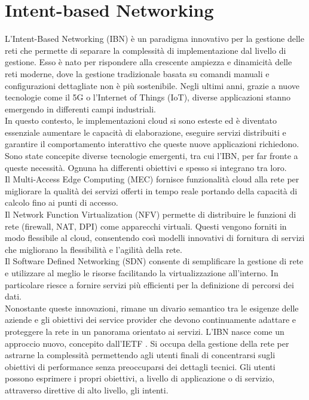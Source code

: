 \section{Intent-based Networking}
L'Intent-Based Networking (IBN) è un paradigma innovativo per la gestione delle reti che permette di separare la complessità di implementazione dal livello di gestione.
Esso è nato per rispondere alla crescente ampiezza e dinamicità delle reti moderne, dove la gestione tradizionale basata su comandi manuali e configurazioni dettagliate non è più sostenibile.
Negli ultimi anni, grazie a nuove tecnologie come il 5G o l'Internet of Things (IoT), diverse applicazioni stanno emergendo in differenti campi industriali.
\\In questo contesto, le implementazioni cloud si sono esteste ed è diventato essenziale aumentare le capacità di elaborazione, eseguire servizi distribuiti e garantire il 
comportamento interattivo che queste nuove applicazioni richiedono.
Sono state concepite diverse tecnologie emergenti, tra cui l'IBN, per far fronte a queste necessità. Ognuna ha differenti obiettivi e spesso si integrano tra loro.
\\Il Multi-Access Edge Computing (MEC) fornisce funzionalità cloud alla rete per migliorare la qualità dei servizi offerti in tempo reale portando della capacità di calcolo fino ai punti di accesso.
\\Il Network Function Virtualization (NFV) permette di distribuire le funzioni di rete (firewall, NAT, DPI) come apparecchi virtuali. Questi vengono forniti in modo flessibile al cloud, consentendo 
così modelli innovativi di fornitura di servizi che migliorano la flessibilità e l'agilità della rete.
\\Il Software Defined Networking (SDN) consente di semplificare la gestione di rete e utilizzare al meglio le risorse facilitando la virtualizzazione all'interno. In particolare riesce a 
fornire servizi più efficienti per la definizione di percorsi dei dati.
\\Nonostante queste innovazioni, rimane un divario semantico tra le esigenze delle aziende e gli obiettivi dei service provider che devono continuamente adattare e proteggere la rete in un panorama orientato ai servizi.
L'IBN nasce come un approccio nuovo, concepito dall'IETF \cite{ietf}. Si occupa della gestione della rete per astrarne la complessità permettendo agli utenti finali di concentrarsi sugli obiettivi di performance senza preoccuparsi dei dettagli tecnici.
Gli utenti possono esprimere i propri obiettivi, a livello di applicazione o di servizio, attraverso direttive di alto livello, gli intenti.
